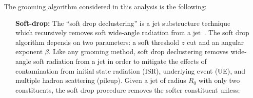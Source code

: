 The grooming algorithm considered in this analysis is the following:
\begin{itemize}
  \item[\bf{Soft-drop}:] The ``soft drop declustering'' is a jet substructure technique which recursively removes soft wide-angle radiation from a jet~\cite{Larkoski:2014wba}. The soft drop algorithm depends on two parameters: a soft threshold $z$ cut and an angular exponent $\beta$. Like any grooming method, soft drop declustering removes wide-angle soft radiation from a jet in order to mitigate the effects of contamination from initial state radiation (ISR), underlying event (UE), and multiple hadron scattering (pileup). Given a jet of radius $R_0$ with only two constituents, the soft drop procedure removes the softer constituent unless:

\end{itemize}
